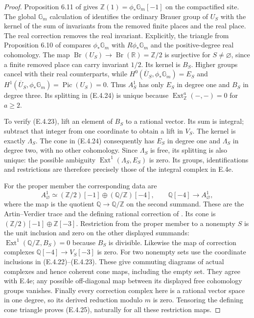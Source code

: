 \begin{proof}
Proposition 6.11 of \citet{D_FlachMorin2018} gives
$\mathbb Z(1)=\phi_*\mathbb G_m[-1]$ on the compactified site.
The global $\mathbb G_m$ calculation of
\citet[II, Proposition 2.1 and Remark 2.2(a),
pp.~163--165]{D_MilneADT2006} identifies the ordinary Brauer
group of $U_S$ with the kernel of the sum of invariants from
the removed finite places and the real place.
The real correction removes the real invariant. Explicitly,
the triangle from Proposition 6.10 of
\citet{D_FlachMorin2018} compares $\phi_*\mathbb G_m$ with
$R\phi_*\mathbb G_m$ and the positive-degree real cohomology.
The map $\operatorname{Br}(U_S)\to\operatorname{Br}(\mathbb R)
=\mathbb Z/2$ is surjective for $S\ne\varnothing$, since a
finite removed place can carry invariant $1/2$.
Its kernel is $B_S$. Higher groups cancel with their real
counterparts, while
$H^0(\overline U_S,\phi_*\mathbb G_m)=E_S$ and
$H^1(\overline U_S,\phi_*\mathbb G_m)
=\operatorname{Pic}(U_S)=0$.
Thus $A_S^1$ has only $E_S$ in degree one and $B_S$ in
degree three. Its splitting in (E.4.24) is unique because
$\operatorname{Ext}^{a}_{\mathbb Z}(-,-)=0$ for $a\ge2$.

To verify (E.4.23), lift an element of $B_S$ to a rational
vector. Its sum is integral; subtract that integer from one
coordinate to obtain a lift in $V_S$. The kernel is exactly
$\Lambda_S$. The cone in (E.4.24) consequently has $E_S$ in
degree one and $\Lambda_S$ in degree two, with no other
cohomology. Since $\Lambda_S$ is free, its splitting is also
unique: the possible ambiguity
$\operatorname{Ext}^1(\Lambda_S,E_S)$ is zero.
Its groups, identifications and restrictions are therefore
precisely those of the integral complex in E.4e.

For the proper member the corresponding data are
\[
 A_\varnothing^1\simeq
  (\mathbb Z/2)[-1]\oplus(\mathbb Q/\mathbb Z)[-4],
 \qquad
 \mathbb Q[-4]\longrightarrow A_\varnothing^1,
 \tag{E.4.26}
\]
where the map is the quotient $\mathbb Q\to\mathbb Q/\mathbb Z$
on the second summand. These are the Artin--Verdier trace and
the defining rational correction of
\citet[Theorem 3.5, Definition 3.6 and \S5.8.3]{D_FlachMorin2018}.
Its cone is $(\mathbb Z/2)[-1]\oplus\mathbb Z[-3]$.
Restriction from the proper member to a nonempty $S$ is the
unit inclusion and zero on the other displayed summands:
$\operatorname{Ext}^1(\mathbb Q/\mathbb Z,B_S)=0$ because
$B_S$ is divisible. Likewise the map of correction complexes
$\mathbb Q[-4]\to V_S[-3]$ is zero.
For two nonempty sets use the coordinate inclusions in
(E.4.22)--(E.4.23). These give commuting diagrams of actual
complexes and hence coherent cone maps, including the empty
set. They agree with E.4e; any possible off-diagonal map
between its displayed free cohomology groups vanishes.
Finally every correction complex here is a rational vector
space in one degree, so its derived reduction modulo $m$
is zero. Tensoring the defining cone triangle proves
(E.4.25), naturally for all these restriction maps.
\end{proof}

